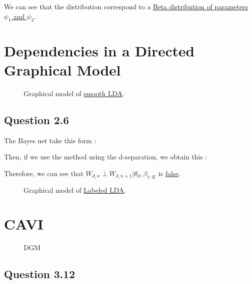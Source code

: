 \documentclass{article}
\begin{document}
We can see that the distribution correspond to a \underline{Beta distribution of parameters $\psi_1$ and $\psi_2$}.

\section{Dependencies in a Directed Graphical Model}

\begin{figure}[H]
    \centering
    
    \caption{Graphical model of \href{https://www.jmlr.org/papers/volume3/blei03a/blei03a.pdf}{smooth LDA}.}
    \label{fig:fig1}
\end{figure}

\subsection*{Question 2.6}

The Bayes net take this form :

\begin{figure}[H]
    \centering
    
    \label{fig:fig2.6.1}
\end{figure}

Then, if we use the method using the d-separation, we obtain this :

\begin{figure}[H]
    \centering
    
    \label{fig:fig2.6.2}
\end{figure}

Therefore, we can see that $W_{d,n} \perp W_{d,n+1} | \theta_d, \beta_{1:K}$ is \underline{false}.

\begin{figure}[H]
    \centering
    
    \caption{Graphical model of \href{https://aclanthology.org/D09-1026.pdf}{Labeled LDA}.}
    \label{fig:fig2}
\end{figure}

\section{CAVI}

\begin{figure}[H]
    \centering
    
    \caption{DGM}
    \label{fig:fig3}
\end{figure}

\subsection*{Question 3.12}
\end{document}
